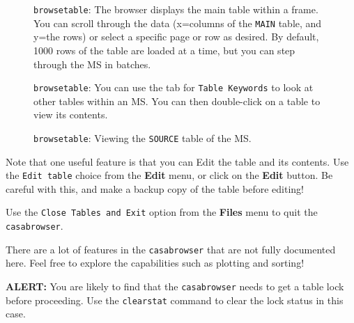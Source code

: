 \begin{figure}[h!]
\begin{center}
\caption{\label{fig:qcasabrowser1} {\tt browsetable}: The browser displays
  the main table within a frame. You can scroll
  through the data (x=columns of the {\tt MAIN} table, and y=the rows) or
  select a specific page or row as desired.  By default, 1000 rows of
  the table are loaded at a time, but you can step through the MS in batches.} 
\hrulefill
\end{center}
\end{figure}

\begin{figure}[h!]
\begin{center}
\caption{\label{fig:qcasabrowser2} {\tt browsetable}: You can use the
  tab for {\tt Table Keywords} to look at other tables within an MS.
  You can then double-click on a table to view its contents.} 
\hrulefill
\end{center}
\end{figure}
 
\begin{figure}[h!]
\begin{center}
\caption{\label{fig:qcasabrowser3} {\tt browsetable}: Viewing the 
{\tt SOURCE} table of the MS.}
\hrulefill
\end{center}
\end{figure}

Note that one useful feature is that you can Edit the table and its
contents.  Use the {\tt Edit table} choice from the {\bf Edit} menu,
or click on the {\bf Edit} button.  Be careful with this, and make
a backup copy of the table before editing!

Use the {\tt Close Tables and Exit} option from the {\bf Files} menu
to quit the {\tt casabrowser}.

There are a lot of features in the {\tt casabrowser}
that are not fully documented here.  Feel free to explore the
capabilities such as plotting and sorting!

{\bf ALERT:} You are likely to find that the {\tt casabrowser}
needs to get a table lock before proceeding.  Use the {\tt clearstat}
command to clear the lock status in this case.




